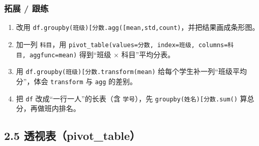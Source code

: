 \subsubsection{拓展 / 跟练}\label{ux62d3ux5c55-ux8ddfux7ec3-7}

\begin{enumerate}
\def\labelenumi{\arabic{enumi}.}
\tightlist
\item
  改用
  \texttt{df.groupby(\textquotesingle{}班级\textquotesingle{}){[}\textquotesingle{}分数\textquotesingle{}{]}.agg({[}\textquotesingle{}mean\textquotesingle{},\textquotesingle{}std\textquotesingle{},\textquotesingle{}count\textquotesingle{}{]})}，并把结果画成条形图。
\item
  加一列 \texttt{科目}，用
  \texttt{pivot\_table(values=\textquotesingle{}分数\textquotesingle{},\ index=\textquotesingle{}班级\textquotesingle{},\ columns=\textquotesingle{}科目\textquotesingle{},\ aggfunc=\textquotesingle{}mean\textquotesingle{})}
  得到``班级 × 科目''平均分表。
\item
  用
  \texttt{df.groupby(\textquotesingle{}班级\textquotesingle{}){[}\textquotesingle{}分数\textquotesingle{}{]}.transform(\textquotesingle{}mean\textquotesingle{})}
  给每个学生补一列``班级平均分''，体会 \texttt{transform} 与
  \texttt{agg} 的差别。
\item
  把 \texttt{df} 改成``一行一人''的长表（含 \texttt{学号}），先
  \texttt{groupby(\textquotesingle{}姓名\textquotesingle{}){[}\textquotesingle{}分数\textquotesingle{}{]}.sum()}
  算总分，再做班内排名。
\end{enumerate}

\subsection{2.5
透视表（pivot\_table）}\label{ux900fux89c6ux8868pivot_table}

